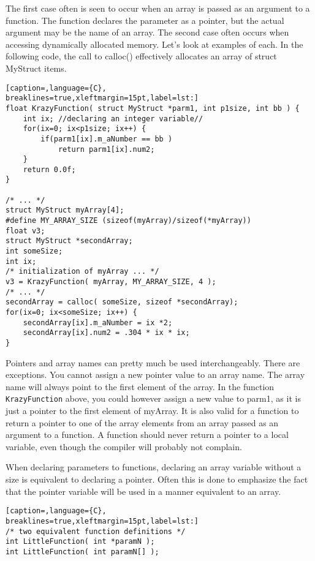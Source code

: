 The first case often is seen to occur when an array is passed as an argument to
a function. The function declares the parameter as a pointer, but the actual
argument may be the name of an array. The second case often occurs when
accessing dynamically allocated memory. Let's look at examples of each. In the
following code, the call to calloc() effectively allocates an array of struct
MyStruct items.
\lstset{basicstyle=\scriptsize, numbers=left, captionpos=b, tabsize=4}
\begin{lstlisting}[caption=,language={C},
breaklines=true,xleftmargin=15pt,label=lst:]
float KrazyFunction( struct MyStruct *parm1, int p1size, int bb ) { 
	int ix; //declaring an integer variable//
	for(ix=0; ix<p1size; ix++) {
		if(parm1[ix].m_aNumber == bb )
			return parm1[ix].num2;
	}
	return 0.0f;
}

/* ... */
struct MyStruct myArray[4];
#define MY_ARRAY_SIZE (sizeof(myArray)/sizeof(*myArray))
float v3;
struct MyStruct *secondArray;
int someSize;
int ix;
/* initialization of myArray ... */
v3 = KrazyFunction( myArray, MY_ARRAY_SIZE, 4 );
/* ... */
secondArray = calloc( someSize, sizeof *secondArray);
for(ix=0; ix<someSize; ix++) {
	secondArray[ix].m_aNumber = ix *2;
	secondArray[ix].num2 = .304 * ix * ix;
}
\end{lstlisting}

Pointers and array names can pretty much be used interchangeably. There are
exceptions. You cannot assign a new pointer value to an array name. The array
name will always point to the first element of the array. In the function
\texttt{KrazyFunction} above, you could however assign a new value to parm1, as
it is just a pointer to the first element of myArray. It is also valid for a
function to return a pointer to one of the array elements from an array passed
as an argument to a function. A function should never return a pointer to a
local variable, even though the compiler will probably not complain.

When declaring parameters to functions, declaring an array variable without a
size is equivalent to declaring a pointer. Often this is done to emphasize the
fact that the pointer variable will be used in a manner equivalent to an array. 
\lstset{basicstyle=\scriptsize, numbers=left, captionpos=b, tabsize=4}
\begin{lstlisting}[caption=,language={C},
breaklines=true,xleftmargin=15pt,label=lst:]
/* two equivalent function definitions */
int LittleFunction( int *paramN );
int LittleFunction( int paramN[] );
\end{lstlisting}

